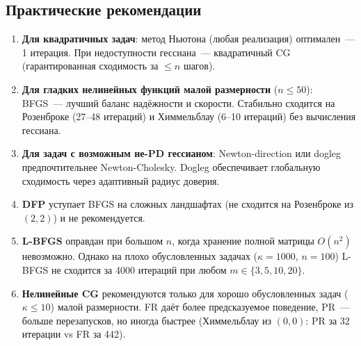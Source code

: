 \documentclass[12pt]{article}
\begin{document}
\subsection*{Практические рекомендации}

\begin{enumerate}
    \item \textbf{Для квадратичных задач}: метод Ньютона (любая реализация) оптимален~--- 1 итерация. При недоступности гессиана~--- квадратичный CG (гарантированная сходимость за $\leq n$ шагов).

    \item \textbf{Для гладких нелинейных функций малой размерности} ($n \leq 50$): BFGS~--- лучший баланс надёжности и скорости. Стабильно сходится на Розенброке (27--48 итераций) и Химмельблау (6--10 итераций) без вычисления гессиана.

    \item \textbf{Для задач с возможным не-PD гессианом}: Newton-direction или dogleg предпочтительнее Newton-Cholesky. Dogleg обеспечивает глобальную сходимость через адаптивный радиус доверия.

    \item \textbf{DFP} уступает BFGS на сложных ландшафтах (не сходится на Розенброке из $(2,2)$) и не рекомендуется.

    \item \textbf{L-BFGS} оправдан при большом $n$, когда хранение полной матрицы $O(n^2)$ невозможно. Однако на плохо обусловленных задачах ($\kappa=1000$, $n=100$) L-BFGS не сходится за 4000 итераций при любом $m \in \{3, 5, 10, 20\}$.

    \item \textbf{Нелинейные CG} рекомендуются только для хорошо обусловленных задач ($\kappa \leq 10$) малой размерности. FR даёт более предсказуемое поведение, PR~--- больше перезапусков, но иногда быстрее (Химмельблау из $(0,0)$: PR за 32 итерации vs FR за 442).
\end{enumerate}
\end{document}
